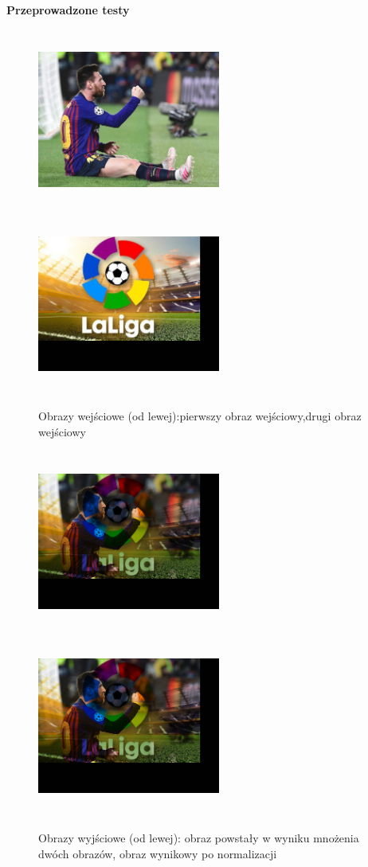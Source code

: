 \documentclass[magisterska,openany]{pracadypl}
\begin{document}
\newpage
\vspace{0.25cm}\textbf{\Large Przeprowadzone testy}
\vspace{0.5cm}
\begin{figure}[h]
\centering
\includegraphics[width=6cm, height=6cm]{2_4/ResolRGB1.jpg}
\includegraphics[width=6cm, height=6cm]{2_4/ResolRGB2.jpg}
\caption{Obrazy wejściowe (od lewej):pierwszy obraz wejściowy,drugi obraz wejściowy}
\end{figure}
\begin{figure}[h]
\centering
\includegraphics[width=6cm, height=6cm]{4_4/multi_twoRGB1.jpg}
\includegraphics[width=6cm, height=6cm]{4_4/nmulti_twoRGB1.jpg}
\caption{Obrazy wyjściowe (od lewej): obraz powstały w wyniku mnożenia dwóch obrazów, obraz wynikowy po normalizacji}
\end{figure}
\end{document}
